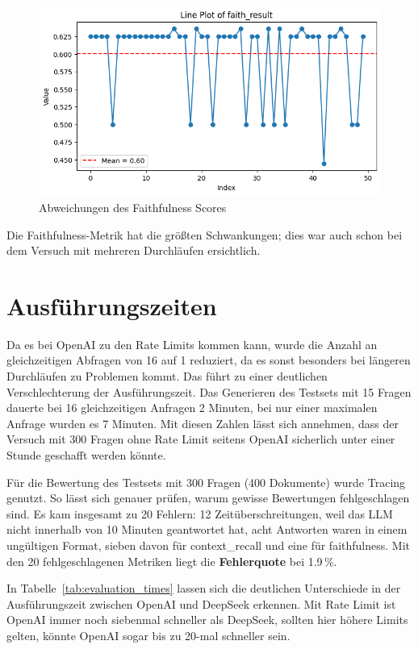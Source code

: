 \begin{figure}[ht!]
    \centering
    \includegraphics[width=1\textwidth]{images/faithfullness.png}
    \caption{Abweichungen des Faithfulness Scores}
    \label{fig:faithfulness_deviation}
\end{figure}

Die Faithfulness-Metrik hat die größten Schwankungen; dies war auch schon bei dem Versuch mit mehreren Durchläufen ersichtlich.

\section{Ausführungszeiten}

Da es bei OpenAI zu den Rate Limits kommen kann, wurde die Anzahl an gleichzeitigen Abfragen von 16 auf 1 reduziert, da es sonst besonders bei längeren Durchläufen zu Problemen kommt.
Das führt zu einer deutlichen Verschlechterung der Ausführungszeit.
Das Generieren des Testsets mit 15 Fragen dauerte bei 16 gleichzeitigen Anfragen 2 Minuten, bei nur einer maximalen Anfrage wurden es 7 Minuten.
Mit diesen Zahlen lässt sich annehmen, dass der Versuch mit 300 Fragen ohne Rate Limit seitens OpenAI sicherlich unter einer Stunde geschafft werden könnte.

Für die Bewertung des Testsets mit 300 Fragen (400 Dokumente) wurde Tracing genutzt.
So lässt sich genauer prüfen, warum gewisse Bewertungen fehlgeschlagen sind.
Es kam insgesamt zu 20 Fehlern: 12 Zeitüberschreitungen, weil das LLM nicht innerhalb von 10 Minuten geantwortet hat, acht Antworten waren in einem ungültigen Format, sieben davon für context\_recall und eine für faithfulness.
Mit den 20 fehlgeschlagenen Metriken liegt die \textbf{Fehlerquote} bei 1.9\,\%.

In Tabelle~\ref{tab:evaluation_times} lassen sich die deutlichen Unterschiede in der Ausführungszeit zwischen OpenAI und DeepSeek erkennen.
Mit Rate Limit ist OpenAI immer noch siebenmal schneller als DeepSeek, sollten hier höhere Limits gelten, könnte OpenAI sogar bis zu 20-mal schneller sein.

